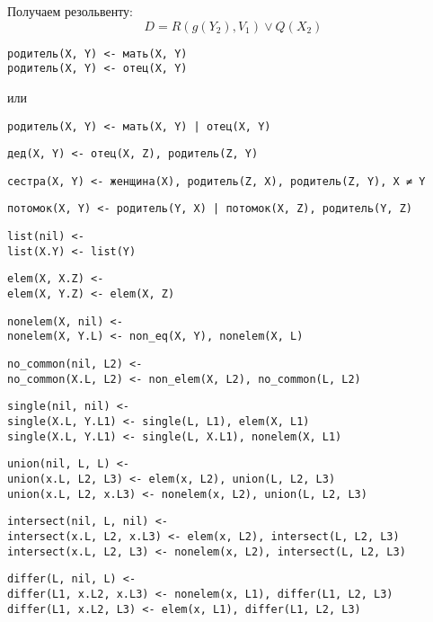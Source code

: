 \documentclass[11pt]{article}
\newcounter{lem}\setcounter{lem}{0}
\begin{document}
Получаем резольвенту:
\begin{equation*}
D = R(g(Y_2), V_1) \lor Q(X_2)
\end{equation*}
\begin{verbatim}
родитель(X, Y) <- мать(X, Y)
родитель(X, Y) <- отец(X, Y)
\end{verbatim}
или
\begin{verbatim}
родитель(X, Y) <- мать(X, Y) | отец(X, Y)
\end{verbatim}
\begin{verbatim}
дед(X, Y) <- отец(X, Z), родитель(Z, Y)
\end{verbatim}
\begin{verbatim}
сестра(X, Y) <- женщина(X), родитель(Z, X), родитель(Z, Y), X ≠ Y
\end{verbatim}
\begin{verbatim}
потомок(X, Y) <- родитель(Y, X) | потомок(X, Z), родитель(Y, Z)
\end{verbatim}
\begin{verbatim}
list(nil) <-
list(X.Y) <- list(Y)
\end{verbatim}
\begin{verbatim}
elem(X, X.Z) <-
elem(X, Y.Z) <- elem(X, Z)
\end{verbatim}
\begin{verbatim}
nonelem(X, nil) <-
nonelem(X, Y.L) <- non_eq(X, Y), nonelem(X, L)
\end{verbatim}
\begin{verbatim}
no_common(nil, L2) <-
no_common(X.L, L2) <- non_elem(X, L2), no_common(L, L2)
\end{verbatim}
\begin{verbatim}
single(nil, nil) <-
single(X.L, Y.L1) <- single(L, L1), elem(X, L1)
single(X.L, Y.L1) <- single(L, X.L1), nonelem(X, L1)
\end{verbatim}
\begin{verbatim}
union(nil, L, L) <-
union(x.L, L2, L3) <- elem(x, L2), union(L, L2, L3)
union(x.L, L2, x.L3) <- nonelem(x, L2), union(L, L2, L3)
\end{verbatim}
\begin{verbatim}
intersect(nil, L, nil) <-
intersect(x.L, L2, x.L3) <- elem(x, L2), intersect(L, L2, L3)
intersect(x.L, L2, L3) <- nonelem(x, L2), intersect(L, L2, L3)
\end{verbatim}
\begin{verbatim}
differ(L, nil, L) <-
differ(L1, x.L2, x.L3) <- nonelem(x, L1), differ(L1, L2, L3)
differ(L1, x.L2, L3) <- elem(x, L1), differ(L1, L2, L3)
\end{verbatim}
\end{document}
